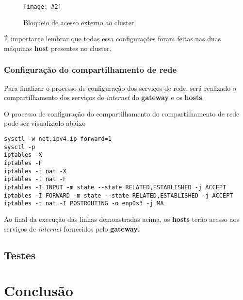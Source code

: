 \documentclass[
	12pt,				%
	openany,			%
	a4paper,			%
	chapter=TITLE,		%
	section=TITLE,		%
	english,
	brazil				%
]{abntex2}
\newcommand{\includeImage}[3] {

\begin{figure}[H]
 	 \centering
  		\texttt{[image: \#2]}
  	\caption{#3}
\end{figure}

}
\begin{document}
\includeImage{0.5}{imgs/4_configuracao_servicos_rede/1_host_2.png}{Bloqueio de acesso externo ao cluster}


É importante lembrar que todas essa configurações foram feitas nas duas máquinas \textbf{host} presentes no cluster.


\subsection{Configuração do compartilhamento de rede}

Para finalizar o processo de configuração dos serviços de rede, será realizado o compartilhamento dos serviços de \textit{internet} do \textbf{gateway} e os \textbf{hosts}.

O processo de configuração do compartilhamento do compartilhamento de rede pode ser visualizado abaixo

\begin{lstlisting}
sysctl -w net.ipv4.ip_forward=1
sysctl -p 
iptables -X
iptables -F
iptables -t nat -X
iptables -t nat -F 
iptables -I INPUT -m state --state RELATED,ESTABLISHED -j ACCEPT
iptables -I FORWARD -m state --state RELATED,ESTABLISHED -j ACCEPT 
iptables -t nat -I POSTROUTING -o enp0s3 -j MA
\end{lstlisting} 

Ao final da execução das linhas demonstradas acima, os \textbf{hosts} terão acesso aos serviços de \textit{internet} fornecidos pelo \textbf{gateway}.
 
\section{Testes}


\chapter{Conclusão}
\end{document}
